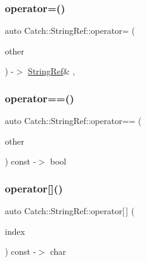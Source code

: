 \mbox{\label{class_catch_1_1_string_ref_a14d5a1983e33c51c6b5fd33bffbebabb}} 
\subsubsection{\texorpdfstring{operator=()}{operator=()}}
{\footnotesize\ttfamily auto Catch\+::\+String\+Ref\+::operator= (\begin{DoxyParamCaption}\item[{\mbox{\hyperlink{class_catch_1_1_string_ref}{String\+Ref}} const \&}]{other }\end{DoxyParamCaption}) -\/$>$ \mbox{\hyperlink{class_catch_1_1_string_ref}{String\+Ref}}\& \hspace{0.3cm}{\ttfamily [inline]}, {\ttfamily [noexcept]}}

\mbox{\label{class_catch_1_1_string_ref_aabb30149ab961187e4b3ff3394bf6e73}} 
\subsubsection{\texorpdfstring{operator==()}{operator==()}}
{\footnotesize\ttfamily auto Catch\+::\+String\+Ref\+::operator== (\begin{DoxyParamCaption}\item[{\mbox{\hyperlink{class_catch_1_1_string_ref}{String\+Ref}} const \&}]{other }\end{DoxyParamCaption}) const -\/$>$  bool\hspace{0.3cm}{\ttfamily [noexcept]}}

\mbox{\label{class_catch_1_1_string_ref_a4ba2e01eec1f0f56c257d213c796ab3b}} 
\subsubsection{\texorpdfstring{operator[]()}{operator[]()}}
{\footnotesize\ttfamily auto Catch\+::\+String\+Ref\+::operator\mbox{[}$\,$\mbox{]} (\begin{DoxyParamCaption}\item[{\mbox{\hyperlink{class_catch_1_1_string_ref_a06b4db8fc82b197004291cf370b2ba7c}{size\+\_\+type}}}]{index }\end{DoxyParamCaption}) const -\/$>$  char\hspace{0.3cm}{\ttfamily [noexcept]}}

